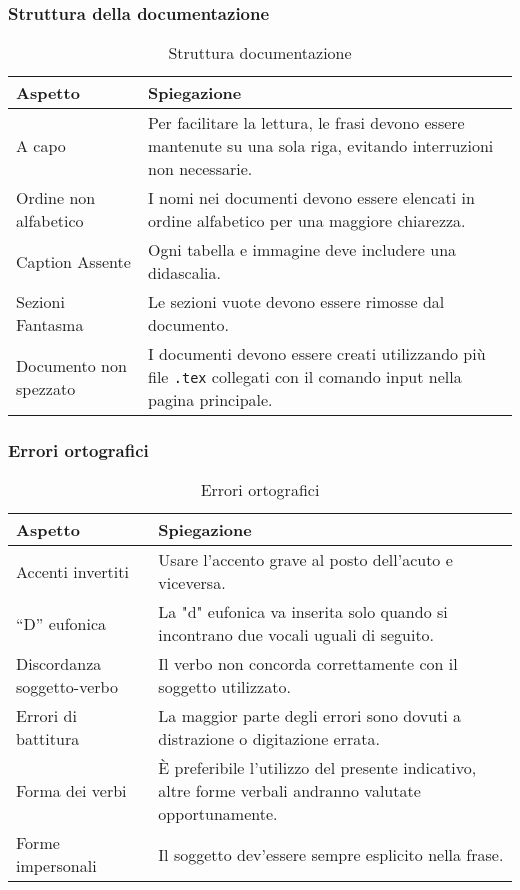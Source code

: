 \subsubsection{Struttura della documentazione}
\begin{table}[h!]
    \centering
    \renewcommand{\arraystretch}{1.5} %
    \begin{tabularx}{\textwidth}{|p{}|X|}
    \hline
    \rowcolor[HTML]{FFD700}
    \textbf{Aspetto} & \textbf{Spiegazione} \\ \hline
    A capo & Per facilitare la lettura, le frasi devono essere mantenute su 
    una sola riga, evitando interruzioni non necessarie. \\ \hline
    Ordine non alfabetico & I nomi nei documenti devono essere elencati 
    in ordine alfabetico per una maggiore chiarezza. \\ \hline
    Caption Assente & Ogni tabella e immagine deve includere una didascalia. \\ \hline
    Sezioni Fantasma & Le sezioni vuote devono essere rimosse dal documento. \\ \hline
    Documento non spezzato & I documenti devono essere creati utilizzando più file \texttt{.tex} collegati 
    con il comando input nella pagina principale. \\ \hline
    \end{tabularx}
    \caption{Struttura documentazione}
\end{table}



\subsubsection{Errori ortografici}
\begin{table}[h!]
    \centering
    \renewcommand{\arraystretch}{1.5} %
    \begin{tabularx}{\textwidth}{|p{}|X|}
    \hline
    \rowcolor[HTML]{FFD700}
    \textbf{Aspetto} & \textbf{Spiegazione} \\ \hline
    Accenti invertiti & Usare l'accento grave al posto dell'acuto e viceversa. \\ \hline
    “D” eufonica & La "d" eufonica va inserita solo quando si incontrano due vocali uguali di seguito. \\ \hline
    Discordanza soggetto-verbo & Il verbo non concorda correttamente con il soggetto utilizzato. \\ \hline
    Errori di battitura & La maggior parte degli errori sono dovuti a distrazione o digitazione errata. \\ \hline
    Forma dei verbi  & È preferibile l’utilizzo del presente indicativo, altre forme verbali andranno valutate opportunamente. \\ \hline
    Forme impersonali & Il soggetto dev’essere sempre esplicito nella frase. \\ \hline

    \end{tabularx}
    \caption{Errori ortografici}
\end{table}


